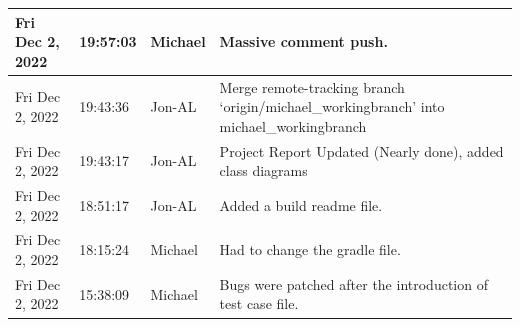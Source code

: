 \documentclass[11pt]{article}
\begin{document}
\begin{center}
\begin{longtable}{|p{2.7cm}|l|p{2cm}|p{8cm}|}
           \hline Fri Dec 2, 2022                            & 19:57:03                           & Michael                                 & Massive comment push.                                                                                                                                                                                                                                                                                      \\
           \hline Fri Dec 2, 2022                            & 19:43:36                           & Jon-AL                                  & Merge remote-tracking branch `origin/michael\_workingbranch' into michael\_workingbranch                                                                                                                                                                                                                     \\
           \hline Fri Dec 2, 2022                            & 19:43:17                           & Jon-AL                                  & Project Report Updated (Nearly done), added class diagrams                                                                                                                                                                                                                                                 \\
           \hline Fri Dec 2, 2022                            & 18:51:17                           & Jon-AL                                  & Added a build readme file.                                                                                                                                                                                                                                                                                 \\
           \hline Fri Dec 2, 2022                            & 18:15:24                           & Michael                                 & Had to change the gradle file.                                                                                                                                                                                                                                                                             \\
           \hline Fri Dec 2, 2022                            & 15:38:09                           & Michael                                 & Bugs were patched after the introduction of test case file.                                                                                                                                                                                                                                                \\

\end{longtable}
\end{center}
\end{document}
